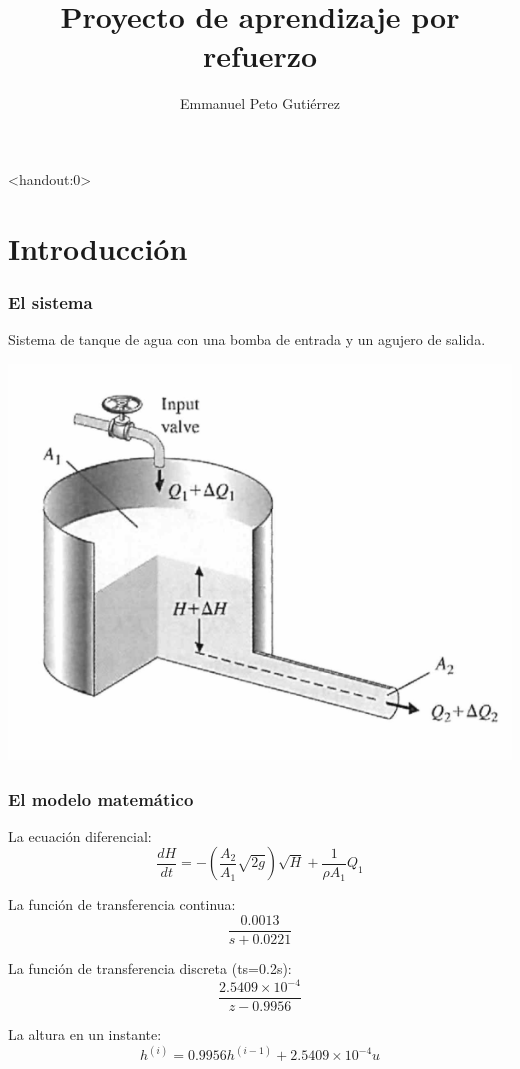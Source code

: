 \documentclass{beamer}
\title{Proyecto de aprendizaje por refuerzo}
\author{Emmanuel Peto Gutiérrez}
\institute{IIMAS \\ UNAM}
\begin{document}
\begin{frame}<handout:0>
\titlepage
\end{frame}

\section{Introducción}

\begin{frame}
\frametitle{El sistema}

Sistema de tanque de agua con una bomba de entrada y un agujero de salida.

\begin{center}
\includegraphics[scale=0.3]{tanque}
\end{center}

\end{frame}

\begin{frame}
\frametitle{El modelo matemático}

La ecuación diferencial: $$\frac{dH}{dt} = - (\frac{A_2}{A_1}\sqrt{2g})\sqrt{H} + \frac{1}{\rho A_1} Q_1$$

La función de transferencia continua: $$\frac{0.0013}{s+0.0221}$$

La función de transferencia discreta (ts=0.2s): $$\frac{2.5409 \times 10^{-4}}{z-0.9956}$$

La altura en un instante: $$ h^{(i)} = 0.9956 h^{(i-1)} + 2.5409 \times 10^{-4}u $$

\end{frame}
\end{document}
